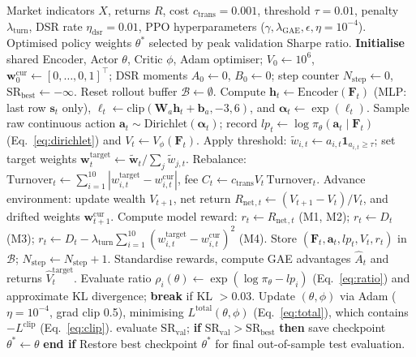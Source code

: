 \documentclass[11pt,a4paper]{article}
\numberwithin{equation}{section}
\numberwithin{table}{section}
\numberwithin{figure}{section}
\numberwithin{algorithm}{section}
\newcommand{\F}{\mathbf{F}}
\newcommand{\bs}{\mathbf{s}}
\newcommand{\ba}{\mathbf{a}}
\newcommand{\bw}{\mathbf{w}}
\newcommand{\balpha}{\bm{\alpha}}
\newcommand{\Rnet}{R_{\mathrm{net}}}
\begin{document}
\begin{algorithm}[H]
\caption{Continuous Dirichlet PPO Daily Portfolio Allocation}\label{alg:ppo}
\footnotesize
\begin{algorithmic}[1]
\Require Market indicators $X$, returns $R$, cost $c_{\mathrm{trans}}=0.001$, threshold $\tau=0.01$, penalty $\lambda_{\mathrm{turn}}$, DSR rate $\eta_{\mathrm{dsr}}=0.01$, PPO hyperparameters ($\gamma,\lambda_{\mathrm{GAE}},\epsilon,\eta=10^{-4}$).
\Ensure Optimised policy weights $\theta^*$ selected by peak validation Sharpe ratio.
\State \textbf{Initialise} shared Encoder, Actor $\theta$, Critic $\phi$, Adam optimiser; $V_0\gets10^6$, $\bw_0^{\mathrm{cur}}\gets[0,\dots,0,1]^\top$; DSR moments $A_0\gets0$, $B_0\gets0$; step counter $N_{\mathrm{step}}\gets0$, $\mathrm{SR}_{\mathrm{best}}\gets-\infty$.
  \State Reset rollout buffer $\mathcal{B}\gets\emptyset$.
    \State Compute $\mathbf{h}_t\gets\mathrm{Encoder}(\F_t)$ (MLP: last row $\bs_t$ only), $\ell_t\gets\mathrm{clip}(\mathbf{W}_a\mathbf{h}_t+\mathbf{b}_a,-3,6)$, and $\balpha_t\gets\exp(\ell_t)$.
    \State Sample raw continuous action $\ba_t\sim\mathrm{Dirichlet}(\balpha_t)$; record $lp_t\gets\log\pi_\theta(\ba_t\mid\F_t)$ (Eq.~\ref{eq:dirichlet}) and $V_t\gets V_\phi(\F_t)$.
    \State Apply threshold: $\tilde w_{i,t}\gets a_{i,t}\mathbf{1}_{a_{i,t}\ge\tau}$; set target weights $\bw_t^{\mathrm{target}}\gets\tilde{\bw}_t/\sum_j\tilde w_{j,t}$.
    \State Rebalance: $\mathrm{Turnover}_t\gets\sum_{i=1}^{10}|w_{i,t}^{\mathrm{target}}-w_{i,t}^{\mathrm{cur}}|$, fee $C_t\gets c_{\mathrm{trans}}V_t\,\mathrm{Turnover}_t$.
    \State Advance environment: update wealth $V_{t+1}$, net return $\Rnet{}_{,t}\gets(V_{t+1}-V_t)/V_t$, and drifted weights $\bw_{t+1}^{\mathrm{cur}}$.
    \State Compute model reward: $r_t\gets\Rnet{}_{,t}$ (M1, M2); $r_t\gets D_t$ (M3); $r_t\gets D_t-\lambda_{\mathrm{turn}}\sum_{i=1}^{10}(w_{i,t}^{\mathrm{target}}-w_{i,t}^{\mathrm{cur}})^2$ (M4).
    \State Store $(\F_t,\ba_t,lp_t,V_t,r_t)$ in $\mathcal{B}$; $N_{\mathrm{step}}\gets N_{\mathrm{step}}+1$.
  \EndFor
  \State Standardise rewards, compute GAE advantages $\hat A_t$ and returns $\hat V_t^{\mathrm{target}}$.
      \State Evaluate ratio $\rho_i(\theta)\gets\exp(\log\pi_\theta-lp_i)$ (Eq.~\ref{eq:ratio}) and approximate KL divergence; \textbf{break} if KL $>0.03$.
      \State Update $(\theta,\phi)$ via Adam ($\eta=10^{-4}$, grad clip 0.5), minimising $L^{\mathrm{total}}(\theta,\phi)$ (Eq.~\ref{eq:total}), which contains $-L^{\mathrm{clip}}$ (Eq.~\ref{eq:clip}).
    \EndFor
  \EndFor
   evaluate $\mathrm{SR}_{\mathrm{val}}$; \textbf{if} $\mathrm{SR}_{\mathrm{val}}>\mathrm{SR}_{\mathrm{best}}$ \textbf{then} save checkpoint $\theta^*\gets\theta$ \textbf{end if}
  \EndIf
\EndWhile
\State Restore best checkpoint $\theta^*$ for final out-of-sample test evaluation.
\end{algorithmic}
\end{algorithm}
\end{document}
